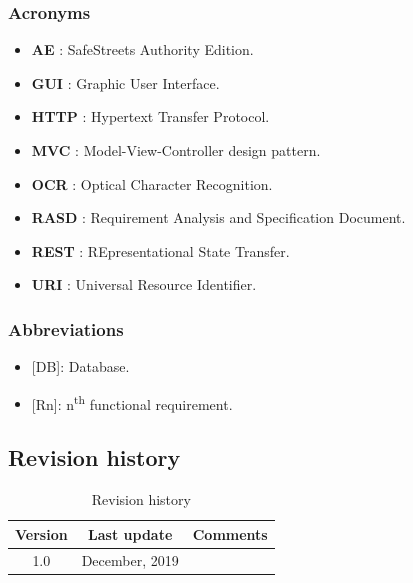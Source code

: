 \documentclass{article}
\begin{document}
		\subsubsection{Acronyms}
		\begin{itemize}
			\item \textbf{AE} \label{AE}: SafeStreets Authority Edition.
			\item \textbf{GUI} \label{GUI}: Graphic User Interface.
			\item \textbf{HTTP} \label{HTTP}: Hypertext Transfer Protocol.
			\item \textbf{MVC} \label{MVC}: Model-View-Controller design pattern.
			\item \textbf{OCR} \label{OCR}: Optical Character Recognition.
			\item \textbf{RASD} \label{RASD}: Requirement Analysis and Specification Document.
			\item \textbf{REST} \label{REST}: REpresentational State Transfer.
			\item \textbf{URI} \label{URI}: Universal Resource Identifier.

		\end{itemize}
		\subsubsection{Abbreviations}
		\begin{itemize}
			\item {[DB]}: Database.
			\item {[Rn]}: n\textsuperscript{th} functional requirement.

		\end{itemize}
		\subsection{Revision history}
			\begin{table}[h]
				\centering
				\begin{tabular}{c c c}
					\hline
					\textbf{Version} & \textbf{Last update} & \textbf{Comments} \\ 
					\hline
					1.0 &  \nth{9} December, 2019  & \\
					\hline
				\end{tabular}
				\caption{Revision history}
				\label{fig:Revision history}
			\end{table}
\end{document}

